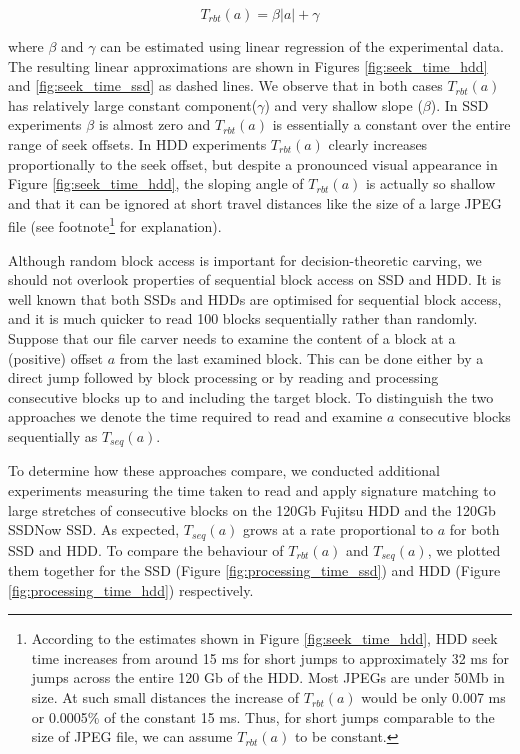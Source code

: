 \documentclass[final,5p,times,twocolumn,authoryear]{elsarticle}
\begin{document}
\begin{equation} \label{eq:tproc-eq}
T_{rbt}(a)=\beta |a|+\gamma
\end{equation}

where $\beta$ and $\gamma$ can be estimated using linear regression of the experimental data. The resulting linear approximations are shown in Figures \ref{fig:seek_time_hdd} and \ref{fig:seek_time_ssd} as dashed lines. We observe that in both cases $T_{rbt}(a)$ has relatively large constant component($\gamma$) and very shallow slope ($\beta$). In SSD experiments $\beta$ is almost zero and $T_{rbt}(a)$ is essentially a constant over the entire range of seek offsets. In HDD experiments $T_{rbt}(a)$ clearly increases proportionally to the seek offset, but despite a pronounced visual appearance in Figure \ref{fig:seek_time_hdd}, the sloping angle of $T_{rbt}(a)$ is actually so shallow and that it can be ignored at short travel distances like the size of a large JPEG file (see footnote\footnote{According to the estimates shown in Figure \ref{fig:seek_time_hdd}, HDD seek time increases from around 15 ms for short jumps to approximately 32 ms for jumps across the entire 120 Gb of the HDD. Most JPEGs are under 50Mb in size. At such small distances the increase of $T_{rbt}(a)$ would be only 0.007 ms or 0.0005\% of the constant 15 ms. Thus, for short jumps comparable to the size of JPEG file, we can assume $T_{rbt}(a)$ to be constant.} for explanation).

Although random block access is important for decision-theoretic carving, we should not overlook properties of sequential block access on SSD and HDD. It is well known that both SSDs and HDDs are optimised for sequential block access, and it is much quicker to read 100 blocks sequentially rather than randomly. Suppose that our file carver needs to examine the content of a block at a (positive) offset $a$ from the last examined block. This can be done either by a direct jump followed by block processing or by reading and processing consecutive blocks up to and including the target block. To distinguish the two approaches we denote the time required to read and examine $a$ consecutive blocks sequentially as $T_{seq}(a)$.

To determine how these approaches compare, we conducted additional experiments measuring the time taken to read and apply signature matching to large stretches of consecutive blocks on the 120Gb Fujitsu HDD and the 120Gb SSDNow SSD. As expected, $T_{seq}(a)$ grows at a rate proportional to $a$ for both SSD and HDD. To compare the behaviour of $T_{rbt}(a)$ and $T_{seq}(a)$, we plotted them together for the SSD (Figure \ref{fig:processing_time_ssd}) and HDD (Figure \ref{fig:processing_time_hdd}) respectively. 
\end{document}
